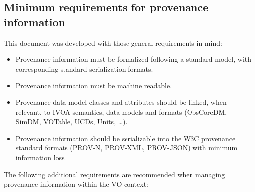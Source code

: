 \subsection{Minimum requirements for provenance information}\label{sec:requirements}

This document was developed with those general requirements in mind:

\begin{itemize}


\item Provenance information must be formalized following a standard model, with corresponding standard serialization formats.

\item Provenance information must be machine readable.

\item Provenance data model classes and attributes should be linked, when relevant, to IVOA semantics, data models and formats (ObsCoreDM, SimDM, VOTable, UCDs, Units, \ldots).

\item Provenance information should be serializable into the W3C provenance standard formats (PROV-N, PROV-XML, PROV-JSON) with minimum information loss.

\end{itemize}

The following additional requirements are recommended when managing provenance information within the VO context:

